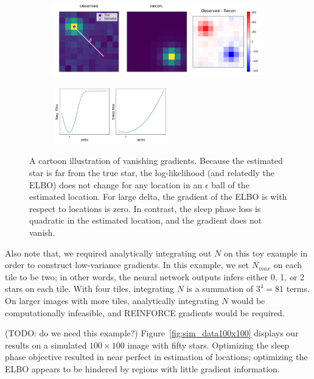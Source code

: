 \begin{figure}[!htb]
    \centering
    \begin{subfigure}[t]{0.8\textwidth}
    \centering
    \includegraphics[width=\textwidth]{figures/gradzero_cartoon.png}
    \end{subfigure}
    \begin{subfigure}[t]{\textwidth}
    \centering
    \includegraphics[width=0.55\textwidth]{figures/gradzero_cartoon2.png}
    \end{subfigure}
    \vspace{-3em}
    \caption{A cartoon illustration of vanishing gradients. Because the estimated star is far from the true star, the log-likelihood (and relatedly the ELBO) does not change for any location in an $\epsilon$ ball of the estimated location. 
    For large delta, the gradient of the ELBO is with respect to locations is zero. In contrast, the sleep phase loss is quadratic in the estimated location, and the gradient does not vanish. }
    \label{fig:gradzero_cartoon}
\end{figure}

Also note that, we required analytically integrating out $N$ on this toy example in order to construct low-variance gradients. 
In this example, we set $N_{max}$ on each tile to be two; in other words, the neural network outputs infers either 0, 1, or 2 stars on each tile.
With four tiles, integrating $N$ is a summation of $3^4 = 81$ terms.
On larger images with more tiles, analytically integrating $N$ would be computationally infeasible, and REINFORCE gradients would be required. 

(TODO: do we need this  example?) Figure~\ref{fig:sim_data100x100} displays our results on a simulated $100\times 100$ image with fifty stars. Optimizing the sleep phase objective resulted in near perfect in estimation of locations; optimizing the ELBO appears to be hindered by regions with little gradient information. 

